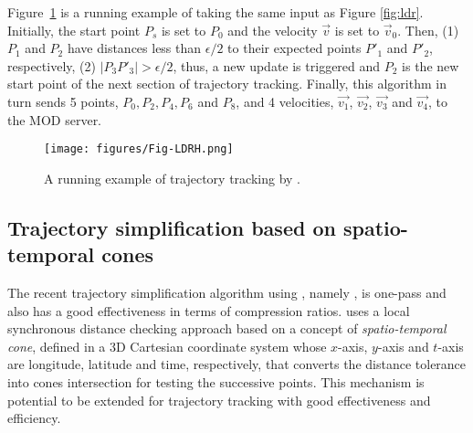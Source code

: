 \begin{example}
Figure~\ref{fig:ldrh} is a running example of \ldrh taking the same input as Figure \ref{fig:ldr}.
Initially, the start point $P_s$ is set to $P_0$ and the velocity $\vec{v}$ is set to $\vec{v}_0$. Then, (1) $P_1$ and $P_2$ have \sed distances less than $\epsilon/2$ to their expected points $P'_1$ and $P'_2$, respectively, (2) $|P_3P'_3| > \epsilon/2$, thus, a new update is triggered and $P_2$ is the new start point of the next section of trajectory tracking. Finally, this algorithm in turn sends 5 points, $P_0, P_2, P_4, P_6$ and $P_8$, and 4 velocities, $\vec{v_1}$, $\vec{v_2}$, $\vec{v_3}$ and $\vec{v_4}$, to the MOD server.
\end{example}

\begin{figure}[tb!]
	\centering
	\texttt{[image: figures/Fig-LDRH.png]}
	\vspace{-1.5ex}
	\caption{\small A running example of trajectory tracking by \ldrh. }
	\vspace{-2ex}
	\label{fig:ldrh}
\end{figure}








\subsection{Trajectory simplification based on spatio-temporal cones}

The recent trajectory simplification algorithm using \sed, namely \cised \cite{Lin:Cised}, is one-pass and also has a good effectiveness in terms of compression ratios. \cised uses a local synchronous distance checking approach based on a concept of \textit{spatio-temporal cone}, defined in a 3D Cartesian coordinate system whose $x$-axis, $y$-axis and $t$-axis are longitude, latitude and time, respectively, that converts the \sed distance tolerance into cones intersection for testing the successive points. This mechanism is potential to be extended for trajectory tracking with good effectiveness and efficiency.

